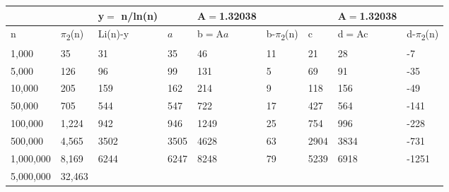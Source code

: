 \documentclass{aomart}
\begin{document}
\begin{table}[H]
\begin{adjustbox}{max width=\textwidth}
\begin{tabular}{|p{2.53cm}|p{1.9cm}|p{1.9cm}|p{1.67cm}|p{1.82cm}|p{1.48cm}|p{1.67cm}|p{1.93cm}|p{1.75cm}|}
\hline
  & 
\textcolor[HTML]{00B0F0}{ } & 
y$=$ n/ln(n) & 
\textcolor[HTML]{808080}{ } & 
A$=$1.32038 & 
& 
\textcolor[HTML]{808080}{ } & 
A$=$1.32038 & 
\textcolor[HTML]{8DB4E2}{ } \\ 
\hline
n & 
\textcolor[HTML]{00B0F0}{ $\pi$\textsubscript{2}(n)} & 
Li(n)-y & 
\( a\) & 
b$=$A\( a\) & 
\textcolor[HTML]{943734}{b-$\pi$\textsubscript{2}(n)} & 
\textcolor[HTML]{808080}{c} & 
\textcolor[HTML]{808080}{d$=$Ac} & 
\textcolor[HTML]{808080}{d-$\pi$\textsubscript{2}(n)} \\ 
\hline
1,000 & 
\textcolor[HTML]{00B0F0}{35} & 
31 & 
35 & 
46 & 
\textcolor[HTML]{943734}{11} & 
\textcolor[HTML]{808080}{21} & 
\textcolor[HTML]{808080}{28} & 
\textcolor[HTML]{808080}{-7} \\ 
\hline
5,000 & 
\textcolor[HTML]{00B0F0}{126} & 
96 & 
99 & 
131 & 
\textcolor[HTML]{943734}{5} & 
\textcolor[HTML]{808080}{69} & 
\textcolor[HTML]{808080}{91} & 
\textcolor[HTML]{808080}{-35} \\ 
\hline
10,000 & 
\textcolor[HTML]{00B0F0}{205} & 
159 & 
162 & 
214 & 
\textcolor[HTML]{943734}{9} & 
\textcolor[HTML]{808080}{118} & 
\textcolor[HTML]{808080}{156} & 
\textcolor[HTML]{808080}{-49} \\ 
\hline
50,000 & 
\textcolor[HTML]{00B0F0}{705} & 
544 & 
547 & 
722 & 
\textcolor[HTML]{943734}{17} & 
\textcolor[HTML]{808080}{427} & 
\textcolor[HTML]{808080}{564} & 
\textcolor[HTML]{808080}{-141} \\ 
\hline
100,000 & 
\textcolor[HTML]{00B0F0}{1,224} & 
942 & 
946 & 
1249 & 
\textcolor[HTML]{943734}{25} & 
\textcolor[HTML]{808080}{754} & 
\textcolor[HTML]{808080}{996} & 
\textcolor[HTML]{808080}{-228} \\ 
\hline
500,000 & 
\textcolor[HTML]{00B0F0}{4,565} & 
3502 & 
3505 & 
4628 & 
\textcolor[HTML]{943734}{63} & 
\textcolor[HTML]{808080}{2904} & 
\textcolor[HTML]{808080}{3834} & 
\textcolor[HTML]{808080}{-731} \\ 
\hline
1,000,000 & 
\textcolor[HTML]{00B0F0}{8,169} & 
6244 & 
6247 & 
8248 & 
\textcolor[HTML]{943734}{79} & 
\textcolor[HTML]{808080}{5239} & 
\textcolor[HTML]{808080}{6918} & 
\textcolor[HTML]{808080}{-1251} \\ 
\hline
5,000,000 & 
\textcolor[HTML]{00B0F0}{32,463} & 

\end{tabular}
\end{adjustbox}
\end{table}
\end{document}
